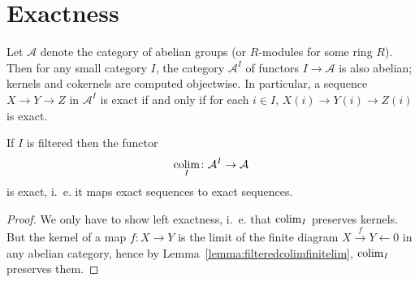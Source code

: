 \documentclass[a4paper,openany]{scrbook}
\begin{document}
\section{Exactness}

Let $\mathcal A$ denote the category of abelian groups (or $R$-modules for some ring $R$). Then for any small category $I$, the category $\mathcal A^I$ of functors $I \to \mathcal A$ is also abelian; kernels and cokernels are computed objectwise. In particular, a sequence $X \to Y \to Z$ in $\mathcal A^I$ is exact if and only if for each $i \in I$, $X(i) \to Y(i) \to Z(i)$ is exact.

\begin{thm}\label{thm:filteredcolimexact}
If $I$ is filtered then the functor
\[
\colim_I \colon \mathcal A^I \to \mathcal A
\]
is exact, i.~e. it maps exact sequences to exact sequences.
\end{thm}
\begin{proof}
We only have to show left exactness, i.~e. that $\colim_I$ preserves kernels. But the kernel of a map $f\colon X \to Y$ is the limit of the finite diagram $X \xrightarrow{f} Y \leftarrow 0$ in any abelian category, hence by Lemma~\ref{lemma:filteredcolimfinitelim}, $\colim_I$ preserves them.
\end{proof}

\nocite{milnor-stasheff}
\nocite{holme:royal-road}
\nocite{hatcher:K-theory}
\nocite{bruner-catanzaro-may}



\end{document}
